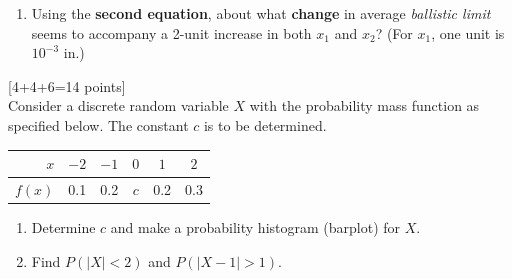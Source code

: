 \documentclass[11pt]{article}
\begin{document}
{\begin{enumerate}[label = (\alph*)]
\hfill {}


\item Using the {\bf second equation}, about what {\bf change} in average
	\emph{ballistic limit} seems to accompany a 2-unit increase in both $x_1$
	and $x_2$? (For $x_1$, one unit is $10^{-3}$ in.)

	\hfill {}

\vskip 2cm

\end{enumerate}


\hfill[4+4+6=14 points] \\

  Consider a discrete random variable $X$ with the probability mass
function as specified below. The constant $c$ is to be determined.\\

\begin{tabular}{|r|c|c|c|c|c|}
  \hline
  $x$ & $-2$ & $-1$ & $0$ & $1$ & $2$ \\
  \hline
  $f(x)$ & 0.1 & 0.2 & $c$ & 0.2 & 0.3 \\
  \hline
\end{tabular}

\begin{enumerate}[label = (\alph*)]

	\item Determine $c$ and make a probability histogram (barplot) for
		$X$.

\vskip 0.5cm

 \hfill {}

\vskip 5cm

\item Find $P(|X| < 2)$ and $P(|X - 1| > 1 )$.



 \hfill {}

\vskip 2cm

 \hfill {}



\end{enumerate}}
\end{document}
